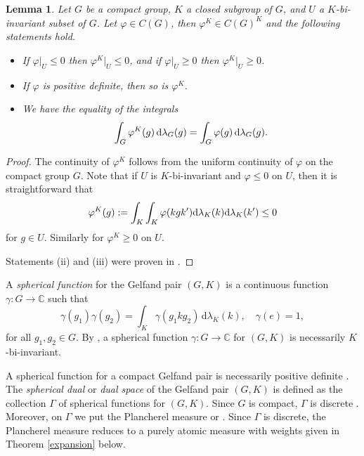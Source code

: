 \documentclass[[a4paper,english,12pt]{amsart}
\theoremstyle{plain}
\newtheorem{lemma}[theorem]{Lemma}
\theoremstyle{remark}
\newcommand{\ff}{\varphi}
\begin{document}
\begin{lemma}\label{Ksymmetrisation} Let $G$ be a compact group, $K$ a closed subgroup of $G$, and $U$ a $K$-bi-invariant subset of $G$. Let $\ff \in C(G)$, then $\ff^K \in C(G)^K$ and the following statements hold. 
\begin{itemize}
    \item [(i)] If $\ff|_{U} \le 0$ then $\ff^K|_U \le 0$, and if $\ff|_{U} \ge 0$ then $\ff^K|_U \ge 0$.
    \item [(ii)] If $\ff$ is positive definite, then so is $\ff^K$.
    \item [(iii)] We have the equality of the integrals
    \begin{equation*}
        \int_{G} \ff^{K}(g) \,\textup{d}\lambda_{G}(g) =   \int_{G} \ff(g) \,\textup{d}\lambda_{G}(g).
    \end{equation*}
\end{itemize}
\end{lemma}

\begin{proof}

The continuity of $\ff^K$ follows from the uniform continuity of $\ff$ on the compact group $G$.
Note that if $U$ is $K$-bi-invariant and $\ff \le 0$ on $U$, then it is straightforward that
\begin{equation*}%
    \ff^{K}(g) := \int_{K}\int_{K} \ff(kgk')\textup{d}\lambda_{K}(k)\textup{d}\lambda_{K}(k') \le 0
\end{equation*}
for $g \in U$. Similarly for $\ff^K \ge 0$ on $U$.

Statements (ii) and (iii) were proven in \cite[Lemma 9]{ramabulana}.
\end{proof}

A \emph{spherical function} for the Gelfand pair $(G,K)$ is a continuous function $\gamma: G \to \mathbb{C}$ such that 
\begin{equation*}
    \gamma(g_1)\gamma(g_2) = \int_{K}\gamma(g_1kg_2) \,\mbox{d}\lambda_{K}(k), \quad \gamma(e)=1,
\end{equation*}
for all $g_1, g_2 \in G$. By \cite[Theorem 8.2.6]{wolf}, a spherical function \(\gamma: G \to \mathbb{C}\) for \((G,K)\) is necessarily \(K\)-bi-invariant.

A spherical function for a compact Gelfand pair is necessarily positive definite \cite[Theorem 9.10.1]{wolf}. The \emph{spherical dual} or \emph{dual space} of the Gelfand pair \((G,K)\) is defined as the collection $\Gamma$ of spherical functions for $(G,K)$. Since \(G\) is compact, \(\Gamma\) is discrete \cite[Proposition 2.4]{bergetal}. Moreover, on $\Gamma$ we put the Plancherel measure \cite[Theorem 2.1]{bergetal} or \cite[Theorem 9.4.1]{wolf}. Since $\Gamma$ is discrete, the Plancherel measure reduces to a purely atomic measure with weights given in Theorem \ref{expansion} below.
\end{document}

